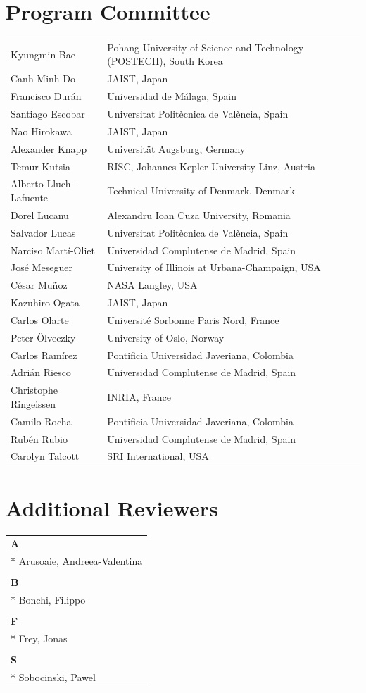 \documentclass[a4paper]{llncs}
\begin{document}
\section*{Program Committee}
\noindent
\begin{longtable}{p{}p{}}
Kyungmin Bae & Pohang University of Science and Technology (POSTECH), South Korea
\\Canh Minh Do & JAIST, Japan
\\Francisco Durán & Universidad de Málaga, Spain
\\Santiago Escobar & Universitat Politècnica de València, Spain
\\Nao Hirokawa & JAIST, Japan
\\Alexander Knapp & Universität Augsburg, Germany
\\Temur Kutsia & RISC, Johannes Kepler University Linz, Austria
\\Alberto Lluch-Lafuente & Technical University of Denmark, Denmark
\\Dorel Lucanu & Alexandru Ioan Cuza University, Romania
\\Salvador Lucas & Universitat Politècnica de València, Spain
\\Narciso Martí-Oliet & Universidad Complutense de Madrid, Spain
\\José Meseguer & University of Illinois at Urbana-Champaign, USA
\\César Muñoz & NASA Langley, USA
\\Kazuhiro Ogata & JAIST, Japan
\\Carlos Olarte & Université Sorbonne Paris Nord, France
\\Peter Ölveczky & University of Oslo, Norway
\\Carlos Ramírez & Pontificia Universidad Javeriana, Colombia
\\Adrián Riesco & Universidad Complutense de Madrid, Spain
\\Christophe Ringeissen &  INRIA, France
\\Camilo Rocha & Pontificia Universidad Javeriana, Colombia
\\Rubén Rubio & Universidad Complutense de Madrid, Spain
\\Carolyn Talcott & SRI International, USA
\\
\end{longtable}

\clearpage


\section*{Additional Reviewers}
\begin{longtable}{l}
\\
\textbf{A} \\*
Arusoaie, Andreea-Valentina 
\\
\\
\textbf{B} \\*
Bonchi, Filippo
\\
\\
\textbf{F} \\*
Frey, Jonas
\\
\\
\textbf{S} \\*
Sobocinski, Pawel
\end{longtable}
\end{document}
